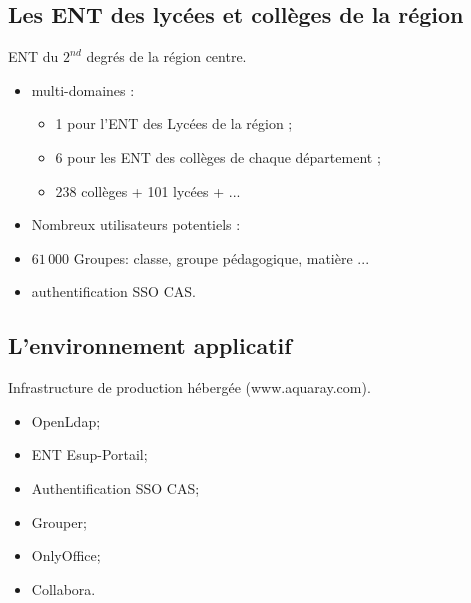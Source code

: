 \subsection{Les ENT des lycées et collèges de la région}
\begin{frame}{\sub}

ENT du $2^{nd}$ degrés de la région centre.

\begin{itemize}
\item multi-domaines :
	\begin{itemize}
		\item 1 pour l'ENT des Lycées de la région ;
		\item 6 pour les  ENT des collèges de chaque département ;
		\item 238 collèges + 101 lycées + ...  
	\end{itemize}
	
\item Nombreux utilisateurs potentiels :
\item  $61\,000$ Groupes: classe, groupe pédagogique, matière ...  
\item authentification SSO CAS.
\end{itemize}

\end{frame}

\subsection{L'environnement applicatif}
\begin{frame}{\sub}
Infrastructure de production hébergée  {\tiny(www.aquaray.com)}.
\begin{itemize}
	\item OpenLdap;
	\item ENT Esup-Portail;
	\item Authentification SSO CAS;
	\item Grouper;
	\item OnlyOffice;
	\item Collabora.
	
\end{itemize}
\end{frame}
